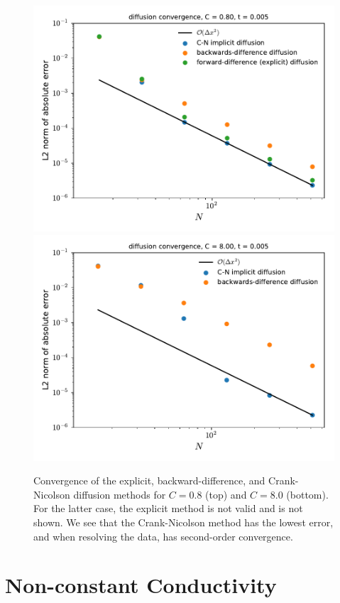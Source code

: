 \begin{figure}
\centering
\includegraphics[width=0.75\linewidth]{diffimplicit-converge-0_8} \\
\includegraphics[width=0.75\linewidth]{diffimplicit-converge-8_0} 
\caption[Convergence of diffusion methods]
{\label{fig:diff:convergence} Convergence of the explicit, backward-difference,
and Crank-Nicolson diffusion methods for $C = 0.8$ (top) and $C = 8.0$ (bottom).
For the latter case, the explicit method is not valid and is not shown.
We see that the Crank-Nicolson method has the lowest error, and when resolving
the data, has second-order convergence.\\
}
\end{figure}



\section{Non-constant Conductivity}

